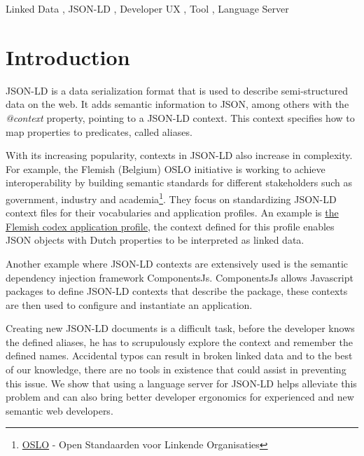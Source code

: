 \documentclass[
]{ceurart}
\begin{document}
\begin{keywords}
  Linked Data \sep 
  JSON-LD \sep
  Developer UX \sep
  Tool \sep
  Language Server
\end{keywords}

\maketitle

\section{Introduction}

JSON-LD is a data serialization format that is used to describe semi-structured data on the web\cite{JSON-LD-W3C}.
It adds semantic information to JSON, among others with the \textit{@context} property, pointing to a JSON-LD context.
This context specifies how to map properties to predicates, called aliases.

With its increasing popularity, contexts in JSON-LD also increase in complexity.
For example, the Flemish (Belgium) OSLO initiative is working to achieve interoperability by building semantic standards for different stakeholders such as government, industry and academia\footnote{\href{https://www.vlaanderen.be/digitaal-vlaanderen/onze-oplossingen/oslo}{OSLO} - Open Standaarden voor Linkende Organisaties}.
They focus on standardizing JSON-LD context files for their vocabularies and application profiles. 
An example is \href{https://data.vlaanderen.be/doc/applicatieprofiel/vlaamse-codex/}{the Flemish codex application profile}, the context defined for this profile enables JSON objects with Dutch properties to be interpreted as linked data.

Another example where JSON-LD contexts are extensively used is the semantic dependency injection framework ComponentsJs\cite{CJS}. 
ComponentsJs allows Javascript packages to define JSON-LD contexts that describe the package, these contexts are then used to configure and instantiate an application.

Creating new JSON-LD documents is a difficult task, before the developer knows the defined aliases, he has to scrupulously explore the context and remember the defined names. 
Accidental typos can result in broken linked data and to the best of our knowledge, there are no tools in existence that could assist in preventing this issue.
We show that using a language server for JSON-LD helps alleviate this problem and can also bring better developer ergonomics for experienced and new semantic web developers.
\end{document}
